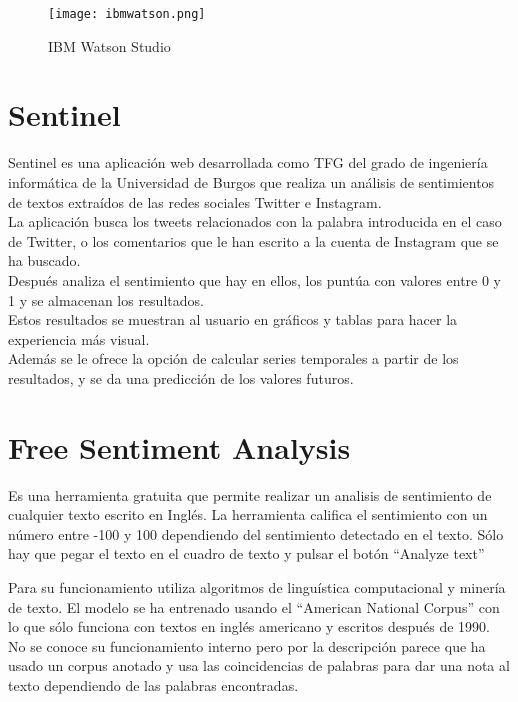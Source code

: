 \begin{figure}[h]
    \advance{} 
    \texttt{[image: ibmwatson.png]}
    \caption{IBM Watson Studio}
\end{figure}
\newpage
\section{Sentinel~\cite{Sentinel1}}
Sentinel es una aplicación web desarrollada como TFG del grado de ingeniería 
informática de la Universidad de Burgos que realiza un análisis de sentimientos de textos 
extraídos de las redes sociales Twitter e Instagram.\\
La aplicación busca los tweets relacionados con la palabra introducida 
en el caso de Twitter, o los comentarios que le han escrito a la 
cuenta de Instagram que se ha buscado.\\
Después analiza el sentimiento que hay en ellos, los puntúa con valores entre 0 y 1 y 
se almacenan los resultados.\\
Estos resultados se muestran al usuario en gráficos 
y tablas para hacer la experiencia más visual.\\ 
Además se le ofrece la opción de calcular series temporales a partir de los resultados, 
y se da una predicción de los valores futuros.

\section{Free Sentiment Analysis~\cite{freesentiment}}
Es una herramienta gratuita que permite realizar un analisis de sentimiento de cualquier 
texto escrito en Inglés. La herramienta califica el sentimiento con un número entre -100 y 100 
dependiendo del sentimiento detectado en el texto.
Sólo hay que pegar el texto en el cuadro de texto y pulsar el botón ``Analyze text''

Para su funcionamiento utiliza algoritmos de linguística computacional y minería de texto.
El modelo se ha entrenado usando el ``American National Corpus'' con lo que sólo funciona con 
textos en inglés americano y escritos después de 1990. 
No se conoce su funcionamiento interno pero por la descripción parece que ha usado un 
corpus anotado y usa las coincidencias de palabras para dar una nota al texto dependiendo 
de las palabras encontradas.